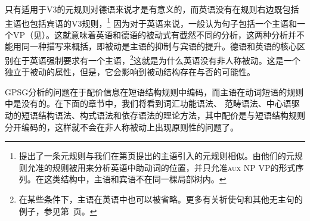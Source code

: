 只有适用于V3的元规则对德语来说才是有意义的，而英语没有在规则右边既包括主语也包括宾语的V3规则，\footnote{%
 \citet[]{GKPS85a}提出了一条元规则与我们在第\pageref{subjekt-meta}页提出的主语引入的元规则相似。由他们的元规则允准的规则被用来分析英语中助动词的位置，并只允准\textsc{aux} NP VP的形式序列。在这类结构中，主语和宾语不在同一棵局部树内。
}
因为对于英语来说，一般认为句子包括一个主语和一个VP（见\citealp[]{GKPS85a}）。这就意味着英语和德语的被动式有截然不同的分析，这两种分析并不能用同一种描写来概括，即被动是主语的抑制与宾语的提升。德语和英语的核心区别在于英语强制要求有一个主语，\footnote{%
  在某些条件下，主语在英语中也可以被省略。更多有关祈使句和其他无主句的例子，参见第~\pageref{Beispiel-Imperativ-Englisch}页。
}这就是为什么英语没有非人称被动。这是一个独立于被动的属性，但是，它会影响到被动结构存在与否的可能性。

GPSG分析的问题在于配价信息在短语结构规则中编码，而主语在动词短语的规则中是没有的。在下面的章节中，我们将看到词汇功能语法\indexlfg、
范畴语法\indexcg、中心语驱动的短语结构语法\indexhpsg、构式语法\indexcxg 和依存语法\indexdg 的理论方法，其中配价是与短语结构规则分开编码的，这样就不会在非人称被动上出现原则性的问题了。

